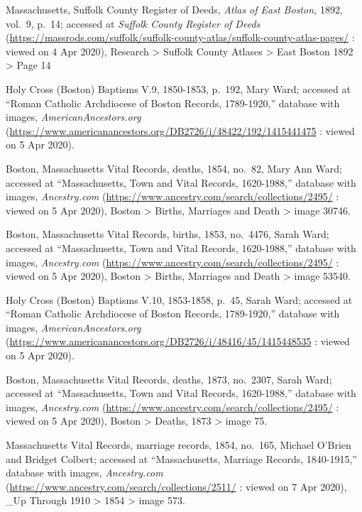 \begin{thebibliography}{999}
	Massachusetts, Suffolk County Register of Deeds, \textit{Atlas of East Boston,} 1892, vol.\ 9, p.\ 14; accessed at \textit{Suffolk County Register of Deeds} (\url{https://massrods.com/suffolk/suffolk-county-atlas/suffolk-county-atlas-pages/} : viewed on 4 Apr 2020), Research > Suffolk County Atlases > East Boston 1892 > Page 14
	
	Holy Cross (Boston) Baptisms V.9, 1850-1853, p.\ 192, Mary Ward; accessed at ``Roman Catholic Archdiocese of Boston Records, 1789-1920,'' database with images, \textit{AmericanAncestors.org} (\url{https://www.americanancestors.org/DB2726/i/48422/192/1415441475} : viewed on 5 Apr 2020).	
	
	Boston, Massachusetts Vital Records, deaths, 1854, no.\ 82, Mary Ann Ward; accessed at ``Massachusetts, Town and Vital Records, 1620-1988,'' database with images, \textit{Ancestry.com} (\url{https://www.ancestry.com/search/collections/2495/} : viewed on 5 Apr 2020), Boston > Births, Marriages and Death > image 30746.
	
	Boston, Massachusetts Vital Records, births, 1853, no.\ 4476, Sarah Ward; accessed at ``Massachusetts, Town and Vital Records, 1620-1988,'' database with images, \textit{Ancestry.com} (\url{https://www.ancestry.com/search/collections/2495/} : viewed on 5 Apr 2020), Boston > Births, Marriages and Death > image 53540.
	
	Holy Cross (Boston) Baptisms V.10, 1853-1858, p.\ 45, Sarah Ward; accessed at ``Roman Catholic Archdiocese of Boston Records, 1789-1920,'' database with images, \textit{AmericanAncestors.org} (\url{https://www.americanancestors.org/DB2726/i/48416/45/1415448535} : viewed on 5 Apr 2020).	
	
	Boston, Massachusetts Vital Records, deaths, 1873, no.\ 2307, Sarah Ward; accessed at ``Massachusetts, Town and Vital Records, 1620-1988,'' database with images, \textit{Ancestry.com} (\url{https://www.ancestry.com/search/collections/2495/} : viewed on 5 Apr 2020), Boston > Deaths, 1873 > image 75.
	
	Massachusetts Vital Records, marriage records, 1854, no.\ 165, Michael O'Brien and Bridget Colbert; accessed at ``Massachusetts, Marriage Records, 1840-1915,'' database with images, \textit{Ancestry.com} (\url{https://www.ancestry.com/search/collections/2511/} : viewed on 7 Apr 2020), \_Up Through 1910 > 1854 > image 573.
	

\end{thebibliography}
